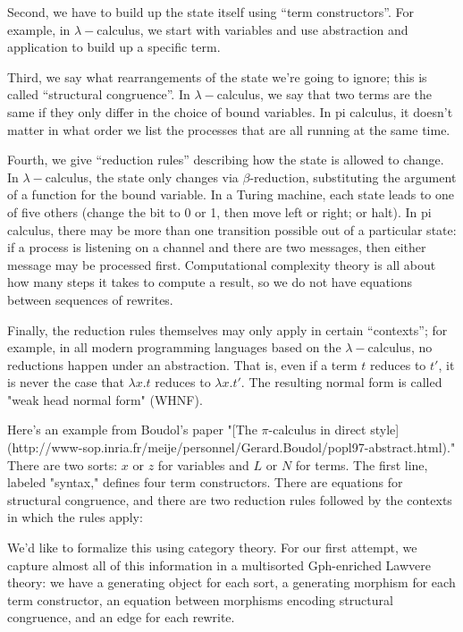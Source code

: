 \documentclass[a4paper,UKenglish]{article}
\begin{document}
Second, we have to build up the state itself using ``term constructors''.  For example, in $\lambda-$calculus, we start with variables and use abstraction and application to build up a specific term.

Third, we say what rearrangements of the state we're going to ignore; this is called ``structural congruence''.  In $\lambda-$calculus, we say that two terms are the same if they only differ in the choice of bound variables.  In pi calculus, it doesn't matter in what order we list the processes that are all running at the same time.

Fourth, we give ``reduction rules'' describing how the state is allowed to change.  In $\lambda-$calculus, the state only changes via $\beta$-reduction, substituting the argument of a function for the
bound variable.  In a Turing machine, each state leads to one of five others (change the bit to 0 or 1, then move left or right; or halt). In pi calculus, there may be more than one transition possible out of a particular state: if a process is listening on a channel and there are two messages, then either message may be processed first. Computational complexity theory is all about how many steps it takes to compute a result, so we do not have equations between sequences of rewrites.

Finally, the reduction rules themselves may only apply in certain ``contexts''; for example, in all modern programming languages based
on the $\lambda-$calculus, no reductions happen under an abstraction. That is, even if a term $t$ reduces to $t'$, it is never the case that $\lambda x.t$ reduces to $\lambda x.t'$.  The resulting normal form is
called "weak head normal form" (WHNF).

Here's an example from Boudol's paper "[The $\pi$-calculus in direct style](http://www-sop.inria.fr/meije/personnel/Gerard.Boudol/popl97-abstract.html)."  There are two sorts: $x$ or $z$ for variables and $L$ or $N$ for
terms.  The first line, labeled "syntax," defines four term constructors.  There are equations for structural congruence, and there are two reduction rules followed by the contexts in which the rules apply: 



We'd like to formalize this using category theory.  For our first attempt, we capture almost all of this information in a multisorted Gph-enriched Lawvere theory: we have a generating object for each sort, a generating morphism for each term constructor, an equation between morphisms encoding structural congruence, and an edge for each rewrite.
\end{document}
